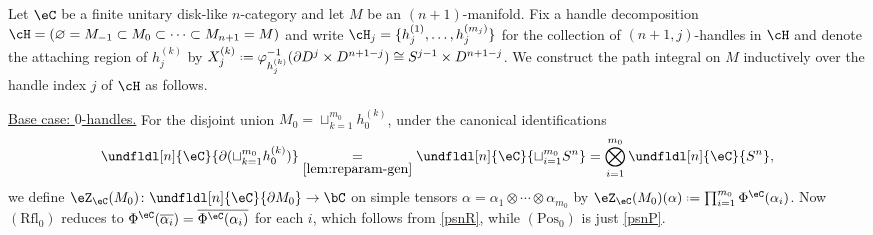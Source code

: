 \documentclass[12pt,reqno]{amsart}
\newcounter{alpha}\renewcommand\thealpha{\upshape\Alph{alpha}}
\newcommand{\psn}{\Phi}
\newcommand{\C}{\eC}
\newcommand{\Z}{\eZ}
\newcommand{\fcj}[1]{\overline{#1}}
\newcommand{\itemstep}[1]{\smallskip\noindent\underline{#1}}
\renewcommand{\amalg}{\sqcup}
\DeclareRobustCommand{\coloneq}{\mathrel{\vcenter{\baselineskip0.5ex\lineskiplimit0pt\hbox{\scriptsize{\upshape.}}\hbox{\scriptsize{\upshape.}}}}=}
\begin{document}
\begin{construction}
\label{cstr:path-integral-via-handle-decomp}
Let $\C$ be a finite unitary disk-like $n$-category and let $M$ be an $(n+1)$-manifold. Fix a handle decomposition
\(
    \cH=(\varnothing=M_{-1}\subset M_0\subset\cdots\subset M_{n+1}=M)
\)
and write $\cH_j=\{h^{(1)}_j,\dots,h^{(m_j)}_j\}$ for the collection of $(n+1,j)$-handles in $\cH$ and denote the attaching region of $h^{(k)}_j$ by $X^{(k)}_j\coloneq\varphi_{h^{(k)}_j}^{-1}(\partial D^j\times D^{n+1-j})\cong S^{j-1}\times D^{n+1-j}$. We construct the path integral on $M$ inductively over the handle index $j$ of $\cH$ as follows.

\itemstep{Base case: $0$-handles.} 
For the disjoint union $M_0=\amalg_{k=1}^{m_0}h_0^{(k)}$, under the canonical identifications
\[
\undfldl[n]{\C}{\partial({\amalg}_{k=1}^{m_0}h_0^{(k)})}
\underset{\eqref{lem:reparam-gen}}=
\undfldl[n]{\C}{{\amalg}_{i=1}^{m_0}S^n}
=
\bigotimes_{i=1}^{m_0}\undfldl[n]{\C}{S^n},
\]
we define $\Z_\C(M_0)\colon\undfldl[n]{\C}{\partial M_0}\to\bC$ on simple tensors $\alpha=\alpha_1\otimes\cdots\otimes\alpha_{m_0}$ by $\Z_\C(M_0)(\alpha)\coloneq\prod_{i=1}^{m_0}\psn^\C(\alpha_i)$. Now $(\mathrm{Rfl}_0)$ reduces to $\psn^\C(\fcj{\alpha_i})=\overline{\psn^\C(\alpha_i)}$ for each $i$, which follows from \ref{psnR}, while $(\mathrm{Pos}_0)$ is just \ref{psnP}.



\end{construction}
\end{document}
